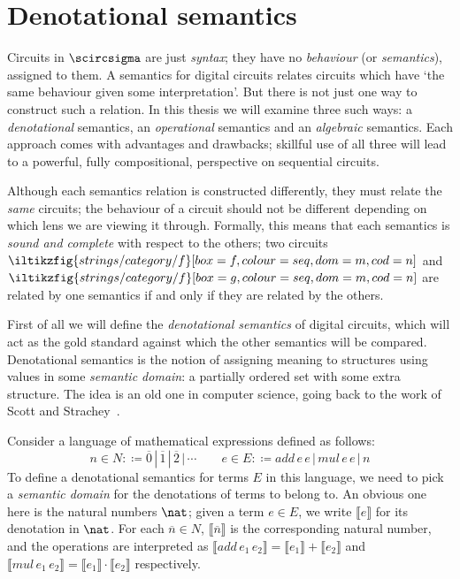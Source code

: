 \chapter{Denotational semantics}\label{chap:denotational}

Circuits in \(\scircsigma\) are just \emph{syntax}; they have no
\emph{behaviour} (or \emph{semantics}), assigned to them.
A semantics for digital circuits relates circuits which have `the
same behaviour given some interpretation'.
But there is not just one way to construct such a relation.
In this thesis we will examine three such ways: a \emph{denotational} semantics,
an \emph{operational} semantics and an \emph{algebraic} semantics.
Each approach comes with advantages and drawbacks; skillful use of all three
will lead to a powerful, fully compositional, perspective on sequential
circuits.

Although each semantics relation is constructed differently, they must
relate the \emph{same} circuits; the behaviour of a circuit should not be
different depending on which lens we are viewing it through.
Formally, this means that each semantics is \emph{sound and complete} with
respect to the others; two circuits \(
\iltikzfig{strings/category/f}[box=f,colour=seq,dom=m,cod=n]
\) and \(
\iltikzfig{strings/category/f}[box=g,colour=seq,dom=m,cod=n]
\) are related by one semantics if and only if they are related by the others.

First of all we will define the \emph{denotational semantics} of digital
circuits, which will act as the gold standard against which the other
semantics will be compared.
Denotational semantics is the notion of assigning meaning to structures using
values in some \emph{semantic domain}: a partially ordered set with some
extra structure.
The idea is an old one in computer science, going back to the work of Scott and
Strachey~\cite{scott1970outline,scott1971mathematical}.

\begin{example}\label{ex:expressions-denotational}
    Consider a language of mathematical expressions defined as
    follows:
    \[
        n \in N :\coloneqq \overline{0} \,|\, \overline{1} \,|\, \overline{2} \,|\,
        \cdots
        \qquad
        e \in E :\coloneqq add \, e \, e \,|\, mul \, e \, e \,|\,  n
    \]
    To define a denotational semantics for terms \(E\) in this language, we need
    to pick a \emph{semantic domain} for the denotations of terms to belong to.
    An obvious one here is the natural numbers \(\nat\); given a term
    \(e \in E\), we write \(\llbracket{e}\rrbracket\) for its denotation in
    \(\nat\).
    For each \(\overline{n} \in N\), \(\llbracket{\overline{n}}\rrbracket\) is
    the corresponding natural number, and the operations are interpreted as \(
    \llbracket{add \, e_1 \, e_2}\rrbracket
    = \llbracket{e_1}\rrbracket + \llbracket{e_2}\rrbracket
    \) and \(
    \llbracket{mul \, e_1 \, e_2}\rrbracket
    = \llbracket{e_1}\rrbracket \cdot \llbracket{e_2}\rrbracket
    \) respectively.
\end{example}

